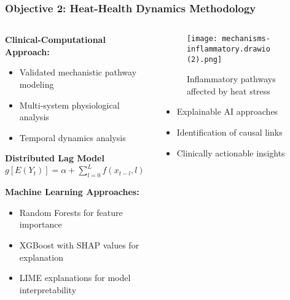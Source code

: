 \documentclass[aspectratio=169]{beamer}
\begin{document}
\begin{frame}
    \frametitle{Objective 2: Heat-Health Dynamics Methodology}
    
    \begin{columns}[T]
        \begin{column}{0.55\textwidth}
            \textbf{\large Clinical-Computational Approach:}
            \begin{itemize}[leftmargin=*, itemsep=3pt]
                \item Validated mechanistic pathway modeling
                \item Multi-system physiological analysis
                \item Temporal dynamics analysis
            \end{itemize}
            
            \textbf{Distributed Lag Model}
            {\small $g[E(Y_t)] = \alpha + \sum_{l=0}^{L}f(x_{t-l}, l)$}
            
            \textbf{\large Machine Learning Approaches:}
            \begin{itemize}[leftmargin=*, itemsep=3pt]
                \item Random Forests for feature importance
                \item XGBoost with SHAP values for explanation
                \item LIME explanations for model interpretability
            \end{itemize}
        \end{column}
        \begin{column}{0.42\textwidth}
            \begin{figure}
                \texttt{[image: mechanisms-inflammatory.drawio (2).png]}
                \caption{\small Inflammatory pathways affected by heat stress}
            \end{figure}
            
            \vspace{-0.2cm}
            \begin{impactbox}
                \begin{itemize}[leftmargin=*, itemsep=2pt]
                    \item Explainable AI approaches
                    \item Identification of causal links
                    \item Clinically actionable insights
                \end{itemize}
            \end{impactbox}
        \end{column}
    \end{columns}
\end{frame}
\end{document}
